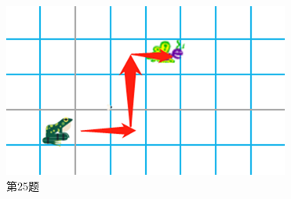 \documentclass[10pt, a4paper]{article}
\begin{document}
    \begin{figure}[htbp]
        \centering
        \begin{minipage}[t]{.23\textwidth}
            \centering
            \includegraphics[width=\textwidth]{25.png}
            \caption*{第25题}
        \end{minipage}
        \begin{minipage}[t]{.23\textwidth}
            \centering
            \begin{minipage}[t]{.23\textwidth}
                \centering

\end{minipage}
\end{minipage}
\end{figure}
\end{document}
